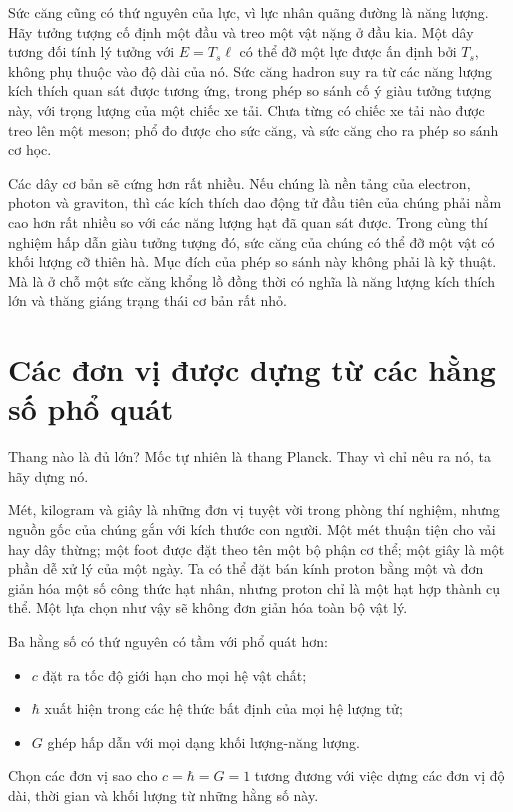 Sức căng cũng có thứ nguyên của lực, vì lực nhân quãng đường là năng lượng. Hãy tưởng tượng cố định một đầu và treo một vật nặng ở đầu kia. Một dây tương đối tính lý tưởng với \(E=T_s\ell\) có thể đỡ một lực được ấn định bởi \(T_s\), không phụ thuộc vào độ dài của nó. Sức căng hadron suy ra từ các năng lượng kích thích quan sát được tương ứng, trong phép so sánh cố ý giàu tưởng tượng này, với trọng lượng của một chiếc xe tải. Chưa từng có chiếc xe tải nào được treo lên một meson; phổ đo được cho sức căng, và sức căng cho ra phép so sánh cơ học.

Các dây cơ bản sẽ cứng hơn rất nhiều. Nếu chúng là nền tảng của electron, photon và graviton, thì các kích thích dao động tử đầu tiên của chúng phải nằm cao hơn rất nhiều so với các năng lượng hạt đã quan sát được. Trong cùng thí nghiệm hấp dẫn giàu tưởng tượng đó, sức căng của chúng có thể đỡ một vật có khối lượng cỡ thiên hà. Mục đích của phép so sánh này không phải là kỹ thuật. Mà là ở chỗ một sức căng khổng lồ đồng thời có nghĩa là năng lượng kích thích lớn và thăng giáng trạng thái cơ bản rất nhỏ.

\section{Các đơn vị được dựng từ các hằng số phổ quát}

Thang nào là đủ lớn? Mốc tự nhiên là thang Planck. Thay vì chỉ nêu ra nó, ta hãy dựng nó.

Mét, kilogram và giây là những đơn vị tuyệt vời trong phòng thí nghiệm, nhưng nguồn gốc của chúng gắn với kích thước con người. Một mét thuận tiện cho vải hay dây thừng; một foot được đặt theo tên một bộ phận cơ thể; một giây là một phần dễ xử lý của một ngày. Ta có thể đặt bán kính proton bằng một và đơn giản hóa một số công thức hạt nhân, nhưng proton chỉ là một hạt hợp thành cụ thể. Một lựa chọn như vậy sẽ không đơn giản hóa toàn bộ vật lý.

Ba hằng số có thứ nguyên có tầm với phổ quát hơn:
\begin{itemize}
  \item \(c\) đặt ra tốc độ giới hạn cho mọi hệ vật chất;
  \item \(\hbar\) xuất hiện trong các hệ thức bất định của mọi hệ lượng tử;
  \item \(G\) ghép hấp dẫn với mọi dạng khối lượng-năng lượng.
\end{itemize}
Chọn các đơn vị sao cho \(c=\hbar=G=1\) tương đương với việc dựng các đơn vị độ dài, thời gian và khối lượng từ những hằng số này.


